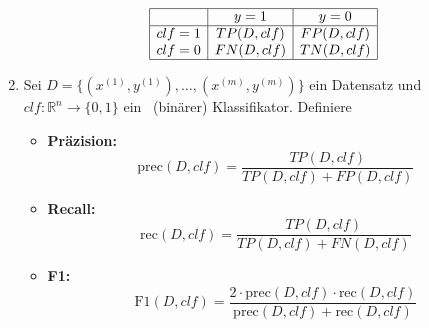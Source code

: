 \begin{enumerate}
          \[
              \begin{array}{|c|c|c|}
                  \hline
                          & y = 1      & y = 0      \\
                  \hline
                  clf = 1 & TP(D, clf) & FP(D, clf) \\
                  clf = 0 & FN(D, clf) & TN(D, clf) \\
                  \hline
              \end{array}
          \]
    \item
          Sei $D = \{(x^{(1)}, y^{(1)}), \dots, (x^{(m)}, y^{(m)})\}$ ein Datensatz und $clf: \mathbb{R}^n \to \{0, 1\}$ ein ~(binärer) Klassifikator. Definiere
          \begin{itemize}
              \item \textbf{Präzision:}
                    \begin{equation}
                        \text{prec}(D, clf) = \frac{TP(D, clf)}{TP(D, clf) + FP(D, clf)}
                    \end{equation}
              \item \textbf{Recall:}
                    \begin{equation}
                        \text{rec}(D, clf) = \frac{TP(D, clf)}{TP(D, clf) + FN(D, clf)}
                    \end{equation}
              \item \textbf{F1:}
                    \begin{equation}
                        \text{F1}(D, clf) = \frac{2 \cdot \text{prec}(D, clf) \cdot \text{rec}(D, clf)}{\text{prec}(D, clf) + \text{rec}(D, clf)}
                    \end{equation}
          \end{itemize}
\end{enumerate}